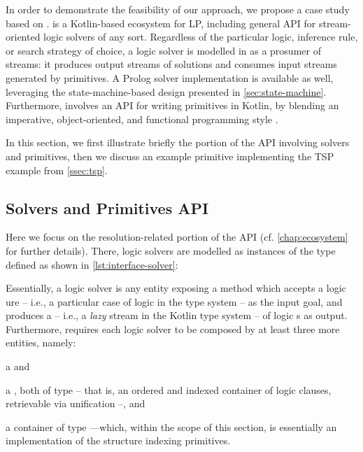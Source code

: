 \documentclass[12pt,a4paper,openright,twoside]{book}
\begin{document}
In order to demonstrate the feasibility of our approach, we propose a case study based on \twopkt{}.
%
\twopkt{} \cite{cco-softwarex-2021-2pkt} is a Kotlin-based ecosystem for LP, including general API for stream-oriented logic solvers of any sort.
%
Regardless of the particular logic, inference rule, or search strategy of choice, a logic solver is modelled in \twopkt{} as a prosumer of streams: it produces output streams of solutions and consumes input streams generated by primitives.
%
A Prolog solver implementation is available as well, leveraging the state-machine-based design presented in \cref{sec:state-machine}.
%
Furthermore, \twopkt{} involves an API for writing primitives in Kotlin, by blending an imperative, object-oriented, and functional programming style .

In this section, we first illustrate briefly the portion of the \twopkt{} API involving solvers and primitives, then we discuss an example primitive implementing the TSP example from \cref{ssec:tsp}.

\subsection{\twopkt{} Solvers and Primitives API}

Here we focus on the resolution-related portion of the \twopkt{} API (cf. \cref{chap:ecosystem} for further details).
%
There, logic solvers are modelled as instances of the  type defined as shown in \cref{lst:interface-solver}:
%

%
Essentially, a logic solver is any entity exposing a method  which accepts a logic ure -- i.e., a particular case of logic  in the \twopkt{} type system -- as the input goal, and produces a  -- i.e., a \emph{lazy} stream in the Kotlin type system -- of logic s as output.
%
Furthermore, \twopkt{} requires each logic solver to be composed by at least three more entities, namely:
%
\begin{inlinelist}
    \item a  and
    \item a , both of type  -- that is, an ordered and indexed container of logic clauses, retrievable via unification --, and
    \item a  container of type ---which, within the scope of this section, is essentially an implementation of the structure indexing primitives.
\end{inlinelist}
\end{document}

